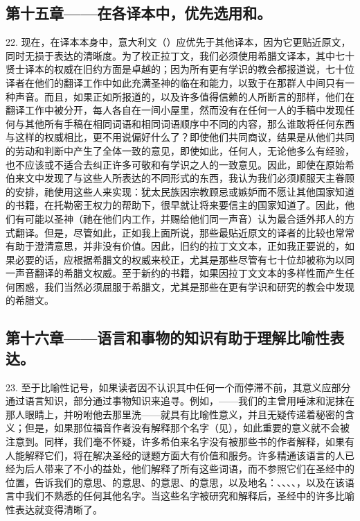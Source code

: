 
\subsection{第十五章——在各译本中，优先选用和。}

22. 现在，在译本本身中，意大利文（）应优先于其他译本，因为它更贴近原文，同时无损于表达的清晰度。为了校正拉丁文，我们必须使用希腊文译本，其中七十贤士译本的权威在旧约方面是卓越的；因为所有更有学识的教会都报道说，七十位译者在他们的翻译工作中如此充满圣神的临在和能力，以致于在那群人中间只有一种声音。而且，如果正如所报道的，以及许多值得信赖的人所断言的那样，他们在翻译工作中被分开，每人各自在一间小屋里，然而没有在任何一人的手稿中发现任何与其他所有手稿在相同词语和相同词语顺序中不同的内容，那么谁敢将任何东西与这样的权威相比，更不用说偏好什么了？即使他们共同商议，结果是从他们共同的劳动和判断中产生了全体一致的意见，即使如此，任何人，无论他多么有经验，也不应该或不适合去纠正许多可敬和有学识之人的一致意见。因此，即使在原始希伯来文中发现了与这些人所表达的不同形式的东西，我认为我们必须顺服天主眷顾的安排，祂使用这些人来实现：犹太民族因宗教顾忌或嫉妒而不愿让其他国家知道的书籍，在托勒密王权力的帮助下，很早就让将来要信主的国家知道了。因此，他们有可能以圣神（祂在他们内工作，并赐给他们同一声音）认为最合适外邦人的方式翻译。但是，尽管如此，正如我上面所说，那些最贴近原文的译者的比较也常常有助于澄清意思，并非没有价值。因此，旧约的拉丁文文本，正如我正要说的，如果必要的话，应根据希腊文的权威来校正，尤其是那些尽管有七十位却被称为以同一声音翻译的希腊文权威。至于新约的书籍，如果因拉丁文文本的多样性而产生任何困惑，我们当然必须屈服于希腊文，尤其是那些在更有学识和研究的教会中发现的希腊文。\par


\subsection{第十六章——语言和事物的知识有助于理解比喻性表达。}

23. 至于比喻性记号，如果读者因不认识其中任何一个而停滞不前，其意义应部分通过语言知识，部分通过事物知识来追寻。例如，——我们的主曾用唾沫和泥抹在那人眼睛上，并吩咐他去那里洗——就具有比喻性意义，并且无疑传递着秘密的含义；但是，如果那位福音作者没有解释那个名字（见），如此重要的意义就不会被注意到。同样，我们毫不怀疑，许多希伯来名字没有被那些书的作者解释，如果有人能解释它们，将在解决圣经的谜题方面大有价值和服务。许多精通该语言的人已经为后人带来了不小的益处，他们解释了所有这些词语，而不参照它们在圣经中的位置，告诉我们的意思、的意思、的意思、的意思，以及地名：、、、、，以及在该语言中我们不熟悉的任何其他名字。当这些名字被研究和解释后，圣经中的许多比喻性表达就变得清晰了。\par

